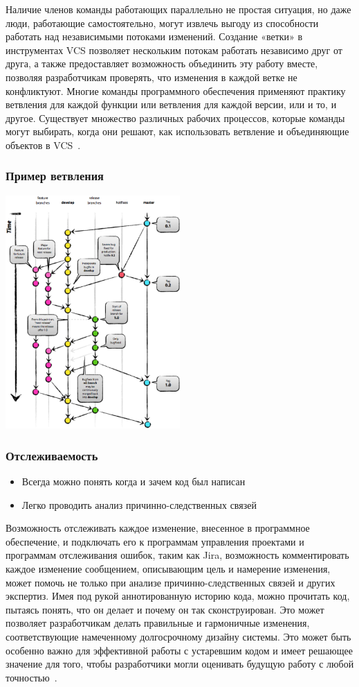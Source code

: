 \documentclass{../industrial-development}
\begin{document}
\lecturenotes

Наличие членов команды работающих параллельно не простая ситуация, но даже люди, работающие самостоятельно, могут извлечь выгоду из способности работать над независимыми потоками изменений. Создание «ветки» в инструментах VCS позволяет нескольким потокам работать независимо друг от друга, а также предоставляет возможность объединить эту работу вместе, позволяя разработчикам проверять, что изменения в каждой ветке не конфликтуют. Многие команды программного обеспечения применяют практику ветвления для каждой функции или ветвления для каждой версии, или и то, и другое. Существует множество различных рабочих процессов, которые команды могут выбирать, когда они решают, как использовать ветвление и объединяющие объектов в VCS~\cite{Atlassian}.

\begin{frame} \frametitle{Пример ветвления}
  \centerline{\includegraphics[width=0.5\textwidth]{branching.pdf}}
\end{frame}

\begin{frame} \frametitle{Отслеживаемость}
 
  \begin{itemize}
  \item Всегда можно понять когда и зачем код был написан
  \item Легко проводить анализ причинно-следственных связей
  \end{itemize}
\end{frame}

\lecturenotes

Возможность отслеживать каждое изменение, внесенное в программное обеспечение, и подключать его к программам управления проектами и программам отслеживания ошибок, таким как Jira, возможность комментировать каждое изменение сообщением, описывающим цель и намерение изменения, может помочь не только при анализе причинно-следственных связей и других экспертиз. Имея под рукой аннотированную историю кода, можно прочитать код, пытаясь понять, что он делает и почему он так сконструирован. Это может позволяет разработчикам делать правильные и гармоничные изменения, соответствующие намеченному долгосрочному дизайну системы. Это может быть особенно важно для эффективной работы с устаревшим кодом и имеет решающее значение для того, чтобы разработчики могли оценивать будущую работу с любой точностью~\cite{Atlassian}.
\end{document}
